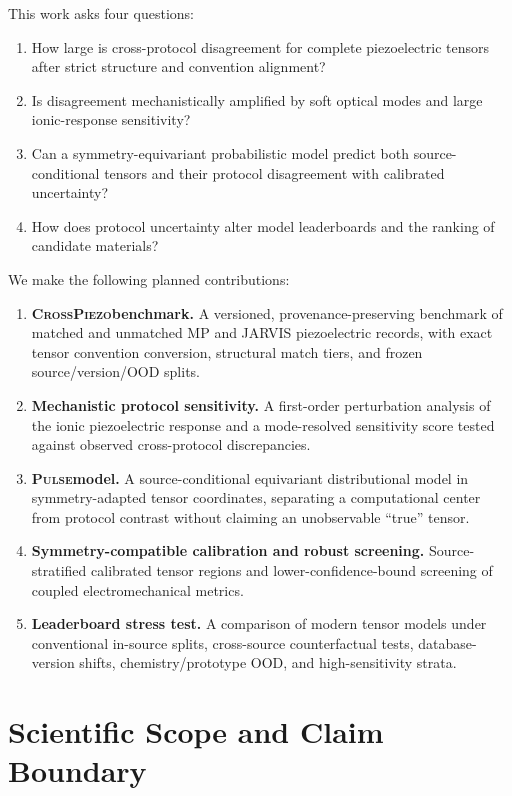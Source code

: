 \documentclass[11pt]{article}
\newcommand{\PULSE}{\textsc{Pulse}}
\newcommand{\CrossPiezo}{\textsc{CrossPiezo}}
\begin{document}
This work asks four questions:
\begin{enumerate}[leftmargin=1.5em]
    \item How large is cross-protocol disagreement for complete piezoelectric tensors after strict structure and convention alignment?
    \item Is disagreement mechanistically amplified by soft optical modes and large ionic-response sensitivity?
    \item Can a symmetry-equivariant probabilistic model predict both source-conditional tensors and their protocol disagreement with calibrated uncertainty?
    \item How does protocol uncertainty alter model leaderboards and the ranking of candidate materials?
\end{enumerate}

We make the following planned contributions:
\begin{enumerate}[leftmargin=1.5em]
    \item \textbf{\CrossPiezo benchmark.} A versioned, provenance-preserving benchmark of matched and unmatched MP and JARVIS piezoelectric records, with exact tensor convention conversion, structural match tiers, and frozen source/version/OOD splits.
    \item \textbf{Mechanistic protocol sensitivity.} A first-order perturbation analysis of the ionic piezoelectric response and a mode-resolved sensitivity score tested against observed cross-protocol discrepancies.
    \item \textbf{\PULSE model.} A source-conditional equivariant distributional model in symmetry-adapted tensor coordinates, separating a computational center from protocol contrast without claiming an unobservable ``true'' tensor.
    \item \textbf{Symmetry-compatible calibration and robust screening.} Source-stratified calibrated tensor regions and lower-confidence-bound screening of coupled electromechanical metrics.
    \item \textbf{Leaderboard stress test.} A comparison of modern tensor models under conventional in-source splits, cross-source counterfactual tests, database-version shifts, chemistry/prototype OOD, and high-sensitivity strata.
\end{enumerate}

\section{Scientific Scope and Claim Boundary}
\end{document}
